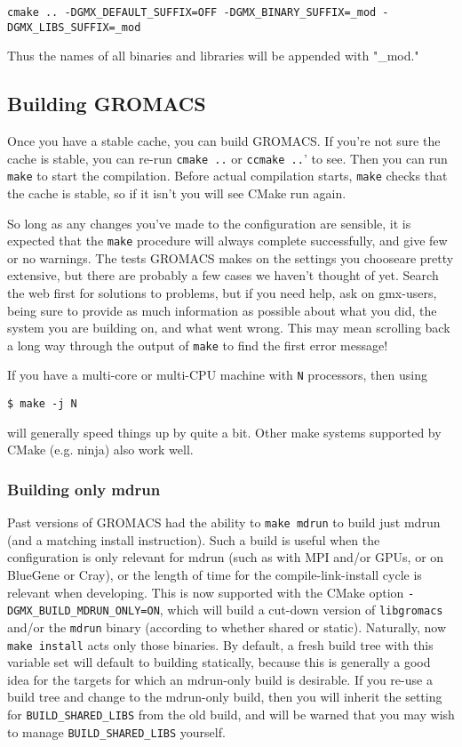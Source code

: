 \documentclass{article}[12pt,a4paper,twoside]
\newcommand{\gromacs}{GROMACS}
\newcommand{\mpi}{MPI}
\newcommand{\cmake}{CMake}
\begin{document}
\begin{verbatim}
cmake .. -DGMX_DEFAULT_SUFFIX=OFF -DGMX_BINARY_SUFFIX=_mod -DGMX_LIBS_SUFFIX=_mod
\end{verbatim}

Thus the names of all binaries and libraries will be appended with
"\_mod."

\subsection{Building \gromacs{}}

Once you have a stable cache, you can build \gromacs{}. If you're not
sure the cache is stable, you can re-run \verb+cmake ..+ or
\verb+ccmake ..+' to see. Then you can run \verb+make+ to start the
compilation. Before actual compilation starts, \verb+make+ checks
that the cache is stable, so if it isn't you will see \cmake{} run
again.

So long as any changes you've made to the configuration are sensible,
it is expected that the \verb+make+ procedure will always complete
successfully, and give few or no warnings. The tests \gromacs{} makes
on the settings you chooseare pretty extensive, but there are probably
a few cases we haven't thought of yet. Search the web first for
solutions to problems, but if you need help, ask on gmx-users, being
sure to provide as much information as possible about what you did,
the system you are building on, and what went wrong. This may mean
scrolling back a long way through the output of \verb+make+ to find
the first error message!

If you have a multi-core or multi-CPU machine with \verb+N+
processors, then using
\begin{verbatim}
$ make -j N
\end{verbatim}
will generally speed things up by quite a bit. Other make systems
supported by \cmake{} (e.g. ninja) also work well.

\subsubsection{Building only mdrun}

Past versions of \gromacs{} had the ability to \verb+make mdrun+ to
build just mdrun (and a matching install instruction). Such a build is
useful when the configuration is only relevant for mdrun (such as with
\mpi{} and/or GPUs, or on BlueGene or Cray), or the length of time for
the compile-link-install cycle is relevant when developing. This is
now supported with the \cmake{} option
\verb+-DGMX_BUILD_MDRUN_ONLY=ON+, which will build a cut-down version
of \verb+libgromacs+ and/or the \verb+mdrun+ binary (according to
whether shared or static). Naturally, now \verb+make install+ acts
only those binaries. By default, a fresh build tree with this variable
set will default to building statically, because this is generally a
good idea for the targets for which an mdrun-only build is
desirable. If you re-use a build tree and change to the mdrun-only
build, then you will inherit the setting for \verb+BUILD_SHARED_LIBS+
from the old build, and will be warned that you may wish to manage
\verb+BUILD_SHARED_LIBS+ yourself.
\end{document}
